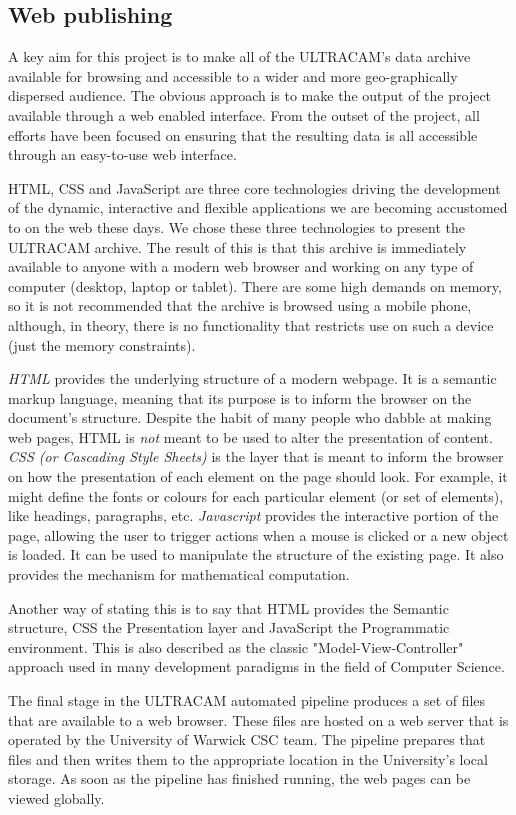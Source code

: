 
\subsection{Web publishing}
A key aim for this project is to make all of the ULTRACAM's data archive available for browsing and accessible to a wider and more geo-graphically dispersed audience. The obvious approach is to make the output of the project available through a web enabled interface. From the outset of the project, all efforts have been focused on ensuring that the resulting data is all accessible through an easy-to-use web interface. 

HTML, CSS and JavaScript are three core technologies driving the development of the dynamic, interactive and flexible applications we are becoming accustomed to on the web these days. We chose these three technologies to present the ULTRACAM archive. The result of this is that this archive is immediately available to anyone with a modern web browser and working on any type of computer (desktop, laptop or tablet). There are some high demands on memory, so it is not recommended that the archive is browsed using a mobile phone, although, in theory, there is no functionality that restricts use on such a device (just the memory constraints). 

\emph{HTML} provides the underlying structure of a modern webpage. It is a semantic markup language, meaning that its purpose is to inform the browser on the document's structure. Despite the habit of many people who dabble at making web pages, HTML is \emph{not} meant to be used to alter the presentation of content. \emph{CSS (or Cascading Style Sheets)} is the layer that is meant to inform the browser on how the presentation of each element on the page should look. For example, it might define the fonts or colours for each particular element (or set of
 elements), like headings, paragraphs, etc. \emph{Javascript} provides the interactive portion of the page, allowing the user to trigger actions when a mouse is
 clicked or a new object is loaded. It can be used to manipulate the structure of the existing page. It also provides the mechanism for mathematical computation.

Another way of stating this is to say that HTML provides the Semantic structure, CSS the Presentation layer and JavaScript the Programmatic environment. This is also described as the classic "Model-View-Controller" approach used in many development paradigms in the field of Computer Science.

The final stage in the ULTRACAM automated pipeline produces a set of files that are available to a web browser. These files are hosted on a web server that is operated by the University of Warwick CSC team. The pipeline prepares that files and then writes them to the appropriate location in the University's local storage. As soon as the pipeline has finished running, the web pages can be viewed globally. 

